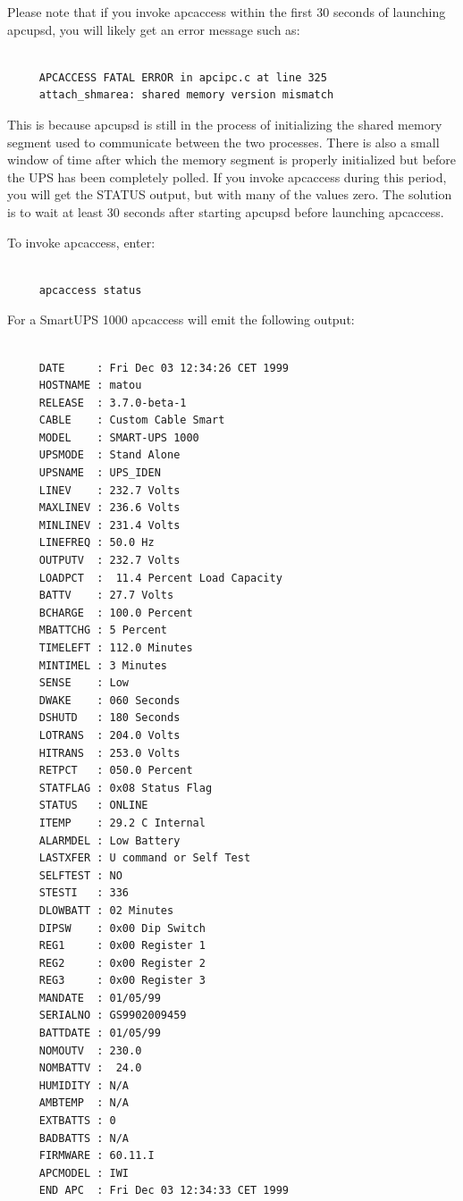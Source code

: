 {{{{Please note that if you invoke apcaccess within the first 30 seconds of
launching apcupsd, you will likely get an error message such as: 

\footnotesize
\begin{verbatim}
     
     APCACCESS FATAL ERROR in apcipc.c at line 325
     attach_shmarea: shared memory version mismatch
\end{verbatim}
\normalsize

This is because apcupsd is still in the process of initializing the shared
memory segment used to communicate between the two processes. There is also a
small window of time after which the memory segment is properly initialized
but before the UPS has been completely polled. If you invoke apcaccess during
this period, you will get the STATUS output, but with many of the values zero.
The solution is to wait at least 30 seconds after starting apcupsd before
launching apcaccess.  

To invoke apcaccess, enter: 

\footnotesize
\begin{verbatim}
     
     apcaccess status
\end{verbatim}
\normalsize

For a SmartUPS 1000 apcaccess will emit the following output: 

\footnotesize
\begin{verbatim}
     
     DATE     : Fri Dec 03 12:34:26 CET 1999
     HOSTNAME : matou
     RELEASE  : 3.7.0-beta-1
     CABLE    : Custom Cable Smart
     MODEL    : SMART-UPS 1000
     UPSMODE  : Stand Alone
     UPSNAME  : UPS_IDEN
     LINEV    : 232.7 Volts
     MAXLINEV : 236.6 Volts
     MINLINEV : 231.4 Volts
     LINEFREQ : 50.0 Hz
     OUTPUTV  : 232.7 Volts
     LOADPCT  :  11.4 Percent Load Capacity
     BATTV    : 27.7 Volts
     BCHARGE  : 100.0 Percent
     MBATTCHG : 5 Percent
     TIMELEFT : 112.0 Minutes
     MINTIMEL : 3 Minutes
     SENSE    : Low
     DWAKE    : 060 Seconds
     DSHUTD   : 180 Seconds
     LOTRANS  : 204.0 Volts
     HITRANS  : 253.0 Volts
     RETPCT   : 050.0 Percent
     STATFLAG : 0x08 Status Flag
     STATUS   : ONLINE
     ITEMP    : 29.2 C Internal
     ALARMDEL : Low Battery
     LASTXFER : U command or Self Test
     SELFTEST : NO
     STESTI   : 336
     DLOWBATT : 02 Minutes
     DIPSW    : 0x00 Dip Switch
     REG1     : 0x00 Register 1
     REG2     : 0x00 Register 2
     REG3     : 0x00 Register 3
     MANDATE  : 01/05/99
     SERIALNO : GS9902009459
     BATTDATE : 01/05/99
     NOMOUTV  : 230.0
     NOMBATTV :  24.0
     HUMIDITY : N/A
     AMBTEMP  : N/A
     EXTBATTS : 0
     BADBATTS : N/A
     FIRMWARE : 60.11.I
     APCMODEL : IWI
     END APC  : Fri Dec 03 12:34:33 CET 1999
\end{verbatim}
\normalsize

}}}}
